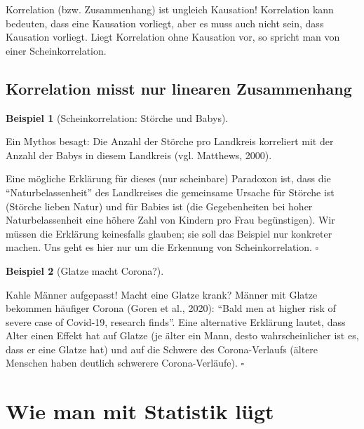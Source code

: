 \documentclass[
  letterpaper,
  twoside,
  open=any]{scrbook}
\theoremstyle{definition}
\theoremstyle{definition}
\theoremstyle{definition}
\newtheorem{example}{Beispiel}[chapter]
\theoremstyle{remark}
\begin{document}
Korrelation (bzw. Zusammenhang) ist ungleich Kausation! Korrelation kann
bedeuten, dass eine Kausation vorliegt, aber es muss auch nicht sein,
dass Kausation vorliegt. Liegt Korrelation ohne Kausation vor, so
spricht man von einer Scheinkorrelation.

\subsection{Korrelation misst nur linearen
Zusammenhang}\label{korrelation-misst-nur-linearen-zusammenhang}

\begin{example}[Scheinkorrelation: Störche und
Babys]\protect\hypertarget{exm-scheinkorr}{}\label{exm-scheinkorr}

Ein Mythos besagt: Die Anzahl der Störche pro Landkreis korreliert mit
der Anzahl der Babys in diesem Landkreis (vgl. Matthews, 2000).

Eine mögliche Erklärung für dieses (nur scheinbare) Paradoxon ist, dass
die \enquote{Naturbelassenheit} des Landkreises die gemeinsame Ursache
für Störche ist (Störche lieben Natur) und für Babies ist (die
Gegebenheiten bei hoher Naturbelassenheit eine höhere Zahl von Kindern
pro Frau begünstigen). Wir müssen die Erklärung keinesfalls glauben; sie
soll das Beispiel nur konkreter machen. Uns geht es hier nur um die
Erkennung von Scheinkorrelation. \(\square\)

\end{example}

\begin{example}[Glatze macht
Corona?]\protect\hypertarget{exm-corona-glatze}{}\label{exm-corona-glatze}

Kahle Männer aufgepasst! Macht eine Glatze krank? Männer mit Glatze
bekommen häufiger Corona (Goren et al., 2020): \enquote{Bald men at
higher risk of severe case of Covid-19, research finds}. Eine
alternative Erklärung lautet, dass Alter einen Effekt hat auf Glatze (je
älter ein Mann, desto wahrscheinlicher ist es, dass er eine Glatze hat)
und auf die Schwere des Corona-Verlaufs (ältere Menschen haben deutlich
schwerere Corona-Verläufe). \(\square\)

\end{example}

\section{Wie man mit Statistik
lügt}\label{wie-man-mit-statistik-luxfcgt-3}
\end{document}
